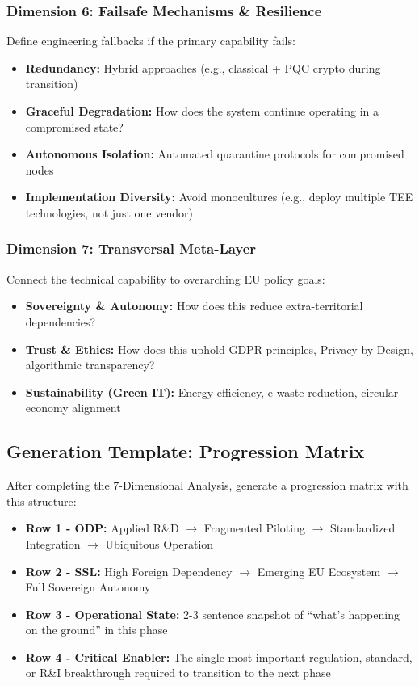 \documentclass[12pt,a4paper]{article}
\begin{document}
\subsubsection*{Dimension 6: Failsafe Mechanisms \& Resilience}
Define engineering fallbacks if the primary capability fails:
\begin{itemize}
    \item \textbf{Redundancy:} Hybrid approaches (e.g., classical + PQC crypto during transition)
    \item \textbf{Graceful Degradation:} How does the system continue operating in a compromised state?
    \item \textbf{Autonomous Isolation:} Automated quarantine protocols for compromised nodes
    \item \textbf{Implementation Diversity:} Avoid monocultures (e.g., deploy multiple TEE technologies, not just one vendor)
\end{itemize}

\subsubsection*{Dimension 7: Transversal Meta-Layer}
Connect the technical capability to overarching EU policy goals:
\begin{itemize}
    \item \textbf{Sovereignty \& Autonomy:} How does this reduce extra-territorial dependencies?
    \item \textbf{Trust \& Ethics:} How does this uphold GDPR principles, Privacy-by-Design, algorithmic transparency?
    \item \textbf{Sustainability (Green IT):} Energy efficiency, e-waste reduction, circular economy alignment
\end{itemize}

\subsection*{Generation Template: Progression Matrix}
After completing the 7-Dimensional Analysis, generate a progression matrix with this structure:

\begin{itemize}
    \item \textbf{Row 1 - ODP:} Applied R\&D $\rightarrow$ Fragmented Piloting $\rightarrow$ Standardized Integration $\rightarrow$ Ubiquitous Operation
    \item \textbf{Row 2 - SSL:} High Foreign Dependency $\rightarrow$ Emerging EU Ecosystem $\rightarrow$ Full Sovereign Autonomy
    \item \textbf{Row 3 - Operational State:} 2-3 sentence snapshot of ``what's happening on the ground''  in this phase
    \item \textbf{Row 4 - Critical Enabler:} The single most important regulation, standard, or R\&I breakthrough required to transition to the next phase
\end{itemize}
\end{document}
